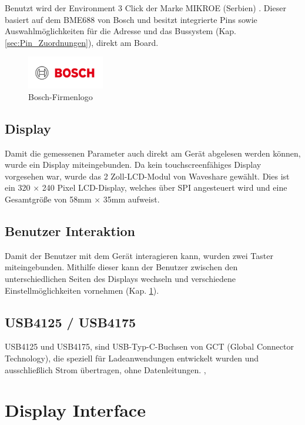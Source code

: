 \begin{inhalt}
Benutzt wird der Environment 3 Click der Marke MIKROE (Serbien) \cite{ENVIRONMENT_3_CLICK}. Dieser basiert auf dem BME688 von Bosch und besitzt integrierte Pins sowie Auswahlmöglichkeiten für die Adresse und das Bussystem (Kap. \ref{sec:Pin_Zuordnungen}), direkt am Board.

\begin{figure}[!htb]
\centering
\includegraphics[width=0.3\textwidth]{files/Tobias/pics/Logos/Bosch-logotype.svg.png}
\caption{Bosch-Firmenlogo \cite{Bosch Logo}}
\label{fig:Bosch-Firmenlogo}
\end{figure}

\subsection{Display}

Damit die gemessenen Parameter auch direkt am Gerät abgelesen werden können, wurde ein Display miteingebunden. Da kein touchscreenfähiges Display vorgesehen war, wurde das 2 Zoll-LCD-Modul von Waveshare gewählt. Dies ist ein 320 × 240 Pixel LCD-Display, welches über SPI angesteuert wird und eine Gesamtgröße von 58mm × 35mm aufweist. \cite{LCDDisplayWiki}

\subsection{Benutzer Interaktion} \label{sec:Benutzer_Interaktionen}

Damit der Benutzer mit dem Gerät interagieren kann, wurden zwei Taster miteingebunden. Mithilfe dieser kann der Benutzer zwischen den unterschiedlichen Seiten des Displays wechseln und verschiedene Einstellmöglichkeiten vornehmen (Kap. \ref{sec:display interface}).

\subsection{USB4125 / USB4175} \label{sec:USB4125_75}

USB4125 und USB4175, sind USB-Typ-C-Buchsen von GCT (Global Connector Technology), die speziell für Ladeanwendungen entwickelt wurden und ausschließlich Strom übertragen, ohne Datenleitungen. \cite{USB4125}, \cite{USB4175}

\section{Display Interface} \label{sec:display interface}


\end{inhalt}
